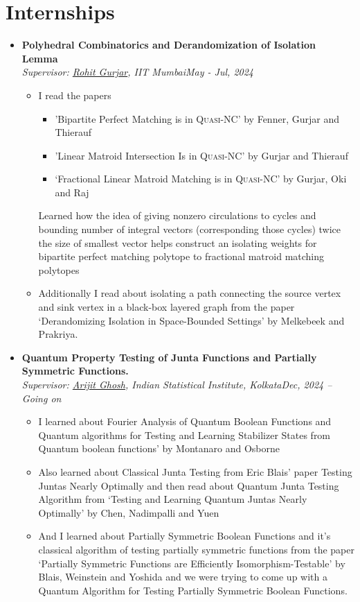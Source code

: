 \documentclass[10pt,a4paper,sans,colorlinks]{moderncv}        %
\newcommand{\heading}[2]{
	\hspace{0pt}#1\hfill#2\\
}
\newcommand{\headingBf}[2]{
	\heading{\textbf{#1}}{\textbf{#2}}
}
\newcommand{\headingIt}[2]{
	\heading{\textit{#1}}{\textit{#2}}
}
\begin{document}
\section{Internships}
\begin{itemize}
	\item \headingBf{Polyhedral Combinatorics and Derandomization of Isolation Lemma}{}
	\headingIt{Supervisor: \href{https://www.cse.iitb.ac.in/~rgurjar/}{Rohit Gurjar}, IIT Mumbai}{May - Jul, 2024}
	\begin{itemize}
		\item I read the papers\begin{itemize}
			\item  'Bipartite Perfect Matching is in \textsc{Quasi-NC}' by Fenner, Gurjar and Thierauf
			\item 'Linear Matroid Intersection Is in \textsc{Quasi-NC}' by Gurjar and Thierauf
			\item `Fractional Linear Matroid Matching is in \textsc{Quasi-NC}' by Gurjar, Oki and Raj
		\end{itemize}Learned how the idea of giving nonzero circulations to cycles and bounding number of integral vectors (corresponding those cycles) twice the size of smallest vector helps construct an isolating weights for bipartite perfect matching polytope to fractional matroid matching polytopes
		\item Additionally I read about isolating a path connecting the source vertex and sink vertex in a black-box layered graph from the paper `Derandomizing Isolation in Space-Bounded Settings' by Melkebeek and Prakriya.
	\end{itemize}
	
	\item \headingBf{Quantum Property Testing of Junta Functions and Partially Symmetric Functions.}{}
	\headingIt{Supervisor: \href{https://sites.google.com/site/homepagearijitghosh/}{Arijit Ghosh}, Indian Statistical Institute, Kolkata}{Dec, 2024 -- Going on}
	\begin{itemize}
		\item I learned about Fourier Analysis of Quantum Boolean Functions and Quantum algorithms for Testing and Learning Stabilizer States from Quantum boolean functions' by Montanaro and Osborne 
		\item Also  learned about Classical Junta Testing from Eric Blais' paper Testing Juntas Nearly Optimally and then read about Quantum Junta Testing Algorithm from `Testing and Learning Quantum Juntas Nearly Optimally' by Chen, Nadimpalli and Yuen
		\item And I learned about Partially Symmetric Boolean Functions and it's classical algorithm of testing partially symmetric functions from the paper `Partially Symmetric Functions are Efficiently Isomorphism-Testable' by Blais, Weinstein and Yoshida and we were trying to come up with a Quantum Algorithm for Testing Partially Symmetric Boolean Functions.
	\end{itemize}
	

\end{itemize}
\end{document}

